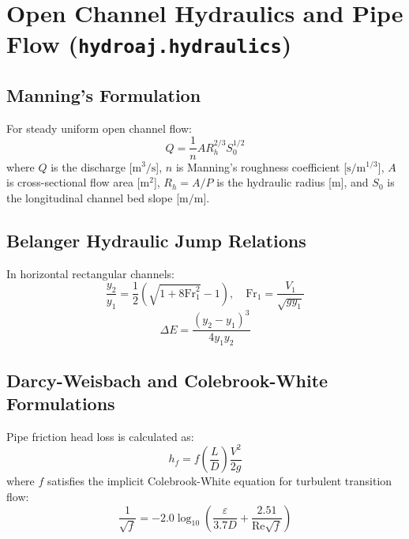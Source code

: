 \documentclass[11pt,a4paper]{article}
\begin{document}
\section{Open Channel Hydraulics and Pipe Flow (\texttt{hydroaj.hydraulics})}

\subsection{Manning's Formulation}
For steady uniform open channel flow:
\begin{equation}
    Q = \frac{1}{n} A R_h^{2/3} S_0^{1/2}
\end{equation}
where $Q$ is the discharge [$\text{m}^3/\text{s}$], $n$ is Manning's roughness coefficient [$\text{s}/\text{m}^{1/3}$], $A$ is cross-sectional flow area [$\text{m}^2$], $R_h = A / P$ is the hydraulic radius [$\text{m}$], and $S_0$ is the longitudinal channel bed slope [$\text{m}/\text{m}$].

\subsection{Belanger Hydraulic Jump Relations}
In horizontal rectangular channels:
\begin{equation}
    \frac{y_2}{y_1} = \frac{1}{2}\left( \sqrt{1 + 8 \text{Fr}_1^2} - 1 \right), \quad \text{Fr}_1 = \frac{V_1}{\sqrt{g y_1}}
\end{equation}
\begin{equation}
    \Delta E = \frac{(y_2 - y_1)^3}{4 y_1 y_2}
\end{equation}

\subsection{Darcy-Weisbach and Colebrook-White Formulations}
Pipe friction head loss is calculated as:
\begin{equation}
    h_f = f \left(\frac{L}{D}\right) \frac{V^2}{2g}
\end{equation}
where $f$ satisfies the implicit Colebrook-White equation for turbulent transition flow:
\begin{equation}
    \frac{1}{\sqrt{f}} = -2.0 \log_{10} \left( \frac{\varepsilon}{3.7 D} + \frac{2.51}{\text{Re}\sqrt{f}} \right)
\end{equation}
\end{document}
